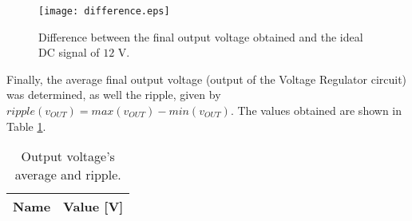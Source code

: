 \begin{figure}[H] \centering
  \texttt{[image: difference.eps]}
  \caption{Difference between the final output voltage obtained and the ideal DC signal of $12$ V.}
  \label{fig:difference_from_12V}
\end{figure}

Finally, the average final output voltage (output of the Voltage Regulator circuit) was determined, as well the ripple, given by $ripple(v_{OUT})=max(v_{OUT})-min(v_{OUT})$. The values obtained are shown in Table \ref{tab:theoretical_finalvoltage_ripple}.

\begin{table}[H]
  \centering
  \begin{tabular}{|c|c|}
    \hline    
    {\bf Name} & {\bf Value [V]} \\ \hline
    
  \end{tabular}
  \caption{Output voltage's average and ripple.}
  \label{tab:theoretical_finalvoltage_ripple}
\end{table}
